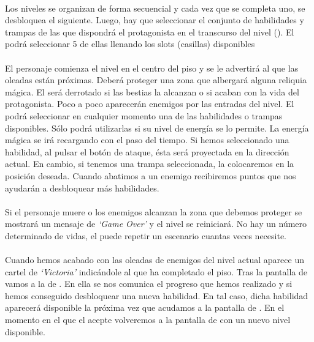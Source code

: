 \paragraph{}
Los niveles se organizan de forma secuencial y cada vez que se completa
uno, se desbloquea el siguiente. Luego, hay que seleccionar el conjunto
de habilidades y trampas de las que dispondrá el protagonista en el transcurso
del nivel (\selhabilidad). El \jugador podrá seleccionar 5 de ellas llenando los slots
(casillas) disponibles

\paragraph{}
El personaje comienza el nivel en el centro del piso y se le advertirá al
\jugador que las oleadas están próximas. Deberá proteger una zona que albergará
alguna reliquia mágica. El \jugador será derrotado si las bestias la alcanzan
o si acaban con la vida del protagonista. Poco a poco aparecerán enemigos
por las entradas del nivel. El \jugador podrá seleccionar en cualquier
momento una de las habilidades o trampas disponibles. Sólo
podrá utilizarlas si su nivel de energía se lo permite. La energía mágica
se irá recargando con el paso del tiempo. Si hemos seleccionado una habilidad,
al pulsar el botón de ataque, ésta será proyectada en la dirección actual.
En cambio, si tenemos una trampa seleccionada, la colocaremos en la posición
deseada. Cuando abatimos a un enemigo recibiremos puntos que nos ayudarán
a desbloquear más habilidades.

\paragraph{}
Si el personaje muere o los enemigos alcanzan la zona que debemos proteger
se mostrará un mensaje de \emph{`Game Over'} y el nivel se reiniciará. No
hay un número determinado de vidas, el \jugador puede repetir un escenario
cuantas veces necesite.

\paragraph{}
Cuando hemos acabado con las oleadas de enemigos del nivel actual
aparece un cartel de \emph{`Victoria'} indicándole al \jugador
que ha completado el piso. Tras la pantalla de \nivel vamos a la de \finnivel.
En ella se nos comunica el progreso que hemos realizado y si hemos
conseguido desbloquear una nueva habilidad. En tal caso, dicha habilidad
aparecerá disponible la próxima vez que acudamos a la pantalla de \selhabilidad.
En el momento en el que el \jugador acepte volveremos a la pantalla de \selnivel con un nuevo
nivel disponible.

